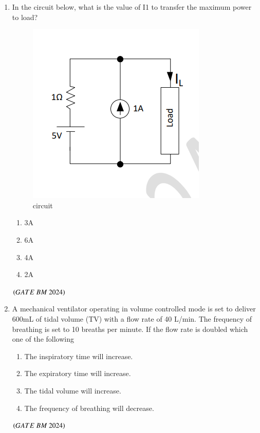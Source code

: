 \documentclass[journal,12pt,onecolumn]{IEEEtran}
\theoremstyle{remark}
\begin{document}
\begin{enumerate}
\item In the circuit below, what is the value of I1 to transfer the maximum power to load?
\begin{figure}[H]
\centering
\includegraphics[width=0.4\columnwidth]{Figs/Fig 11.png}
\caption{circuit}
\label{fig:placeholder}
\end{figure}
\begin{enumerate}[label=(\Alph*)]
    \item 3A
    \item 6A
    \item 4A
    \item 2A
\end{enumerate}
\hfill $\brak{GATE\ BM\ 2024}$

\item A mechanical ventilator operating in volume controlled mode is set to deliver 600mL of tidal volume (TV) with a flow rate of 40 L/min. The frequency of breathing is set to 10 breaths per minute. If the flow rate is doubled which one of the following
\begin{enumerate}[label=(\Alph*)]
    \item The inspiratory time will increase.
    \item The expiratory time will increase.
    \item The tidal volume will increase.
    \item The frequency of breathing will decrease.
\end{enumerate}
\hfill $\brak{GATE\ BM\ 2024}$


\end{enumerate}
\end{document}
